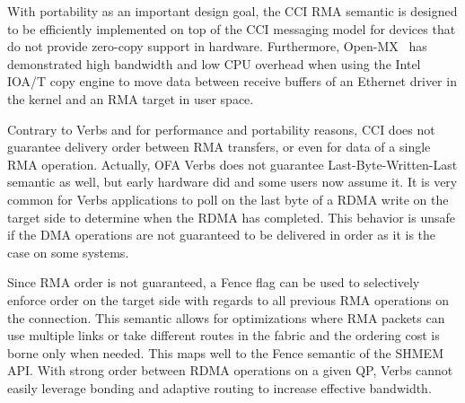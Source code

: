 With portability as an important design goal, the CCI RMA semantic is 
designed to be efficiently implemented on top of the CCI messaging model 
for devices that do not provide zero-copy support in hardware. 
Furthermore, Open-MX~\cite{Gog11ParCo} has demonstrated high bandwidth and low CPU 
overhead when using the Intel IOA/T copy engine to move data between receive 
buffers of an Ethernet driver in the kernel and an RMA target in user 
space.

Contrary to Verbs  and for performance and portability reasons, CCI does not guarantee delivery 
order between RMA transfers, or even for data of a single RMA operation. 
Actually, OFA Verbs does not guarantee Last-Byte-Written-Last 
semantic as well, but early hardware did and some users now assume it. It is 
very common for Verbs applications to poll on the last byte of a RDMA write 
on the target side to determine when the RDMA has completed. This behavior is 
unsafe if the DMA operations are not guaranteed to be delivered in order as 
it is the case on some systems.

Since RMA order is not guaranteed, a Fence flag can be used to selectively 
enforce order on the target side with regards to all previous RMA operations 
on the connection. This semantic allows for optimizations where RMA packets 
can use multiple links or take different routes in the fabric and the ordering 
cost is borne only when needed. This maps well to the Fence semantic of the 
SHMEM~\cite{openshmem} API. With strong order between RDMA operations on a 
given QP, Verbs cannot easily leverage  bonding and adaptive routing to 
increase effective bandwidth.
